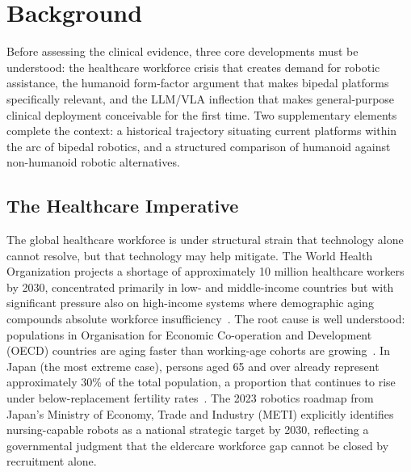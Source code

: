 ﻿%
\section{Background}
\label{sec:background}

Before assessing the clinical evidence, three core developments must be
understood: the healthcare workforce crisis that creates demand for robotic
assistance, the humanoid form-factor argument that makes bipedal platforms
specifically relevant, and the LLM/VLA inflection that makes general-purpose
clinical deployment conceivable for the first time. Two supplementary elements
complete the context: a historical trajectory situating current platforms within
the arc of bipedal robotics, and a structured comparison of humanoid against
non-humanoid robotic alternatives.

\subsection{The Healthcare Imperative}
\label{sec:imperative}

The global healthcare workforce is under structural strain that technology alone
cannot resolve, but that technology may help mitigate. The World Health
Organization projects a shortage of approximately 10 million healthcare workers
by 2030, concentrated primarily in low- and middle-income countries but with
significant pressure also on high-income systems where demographic aging compounds
absolute workforce insufficiency~\cite{who2016workforce}. The root cause is well
understood: populations in Organisation for Economic Co-operation and Development
(OECD) countries are aging faster than working-age cohorts are
growing~\cite{oecd2023health}. In Japan (the most extreme case), persons aged 65
and over already represent approximately 30\% of the total population, a
proportion that continues to rise under below-replacement fertility
rates~\cite{japancabinet2023}. The 2023 robotics roadmap from Japan's
Ministry of Economy, Trade and Industry (METI) explicitly identifies
nursing-capable robots as a national strategic target by 2030,
reflecting a governmental judgment that the eldercare workforce gap cannot be
closed by recruitment alone.

